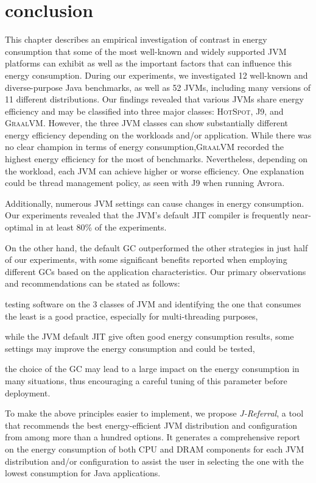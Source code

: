 \clearpage
\section{conclusion}
This chapter describes an empirical investigation of contrast in energy consumption that some of the most well-known and widely supported JVM platforms can exhibit as well as the important factors that can influence this energy consumption.
During our experiments, we investigated 12 well-known and diverse-purpose Java benchmarks, as well as 52 JVMs, including many versions of 11 different distributions.
Our findings revealed that various JVMs share energy efficiency and may be classified into three major classes: \textsc{HotSpot}, \textsc{J9}, and \textsc{GraalVM}.
However, the three JVM classes can show substantially different energy efficiency depending on the workloads and/or application.
While there was no clear champion in terms of energy consumption,\textsc{GraalVM} recorded the highest energy efficiency for the most of benchmarks. Nevertheless, depending on the workload, each JVM can achieve higher or worse efficiency.
One explanation could be thread management policy, as seen with \textsc{J9} when running \textsf{Avrora}.

Additionally, numerous JVM settings can cause changes in energy consumption. Our experiments revealed that the JVM's default JIT compiler is frequently near-optimal in at least 80\% of the experiments.

On the other hand, the default GC outperformed the other strategies in just half of our experiments, with some significant benefits reported when employing different GCs based on the application characteristics. Our primary observations and recommendations can be stated as follows:
\begin{inparaenum}[\em i)]
    \item testing software on the 3 classes of JVM and identifying the one that consumes the least is a good practice, especially for multi-threading purposes,
    \item while the JVM default JIT give often good energy consumption results, some settings may improve the energy consumption and could be tested,
    \item the choice of the GC may lead to a large impact on the energy consumption in many situations, thus encouraging a careful tuning of this parameter before deployment.
\end{inparaenum}

To make the above principles easier to implement, we propose \emph{J-Referral}, a tool that recommends the best energy-efficient JVM distribution and configuration from among more than a hundred options.
It generates a comprehensive report on the energy consumption of both CPU and DRAM components for each JVM distribution and/or configuration to assist the user in selecting the one with the lowest consumption for Java applications.
